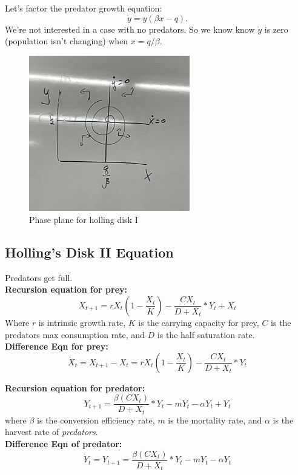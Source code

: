 \documentclass{article}
\begin{document}
Let's factor the predator growth equation: 
$$ \dot y = y(\beta x - q).$$
We're not interested in a case with no predators. So we know know $\dot y$ is zero (population isn't changing) when $x = q/ \beta$.

\begin{figure}[htp]
    \centering
    \includegraphics[width=7cm]{phase_plane_3.png}
    \caption{Phase plane for holling disk I}
\end{figure}

\subsection{Holling's Disk II Equation}
Predators get full. \\

\textbf{Recursion equation for prey:}
$$X_{t+1} = r X_t (1 - \frac{X_t}{K}) - \frac{C X_t}{D + X_t}* Y_t + X_t$$
Where $r$ is intrinsic growth rate, $K$ is the carrying capacity for prey, $C$ is the predators max consumption rate, and $D$ is the half saturation rate. \\

\textbf{Difference Eqn for prey:}
$$\dot X_t = X_{t+1} - X_t = r X_t (1 - \frac{X_t}{K}) - \frac{C X_t}{D + X_t}* Y_t $$

\textbf{Recursion equation for predator:}
$$Y_{t+1} = \frac{\beta(CX_t)}{D + X_t}*Y_t - mY_t - \alpha Y_t + Y_t$$
where $\beta$ is the conversion efficiency rate, $m$ is the mortality rate, and $\alpha$ is the harvest rate of \textit{predators}. \\

\textbf{Difference Eqn of predator:}
$$\dot Y_t = Y_{t+1} = \frac{\beta(CX_t)}{D + X_t}*Y_t - mY_t - \alpha Y_t$$
\end{document}

